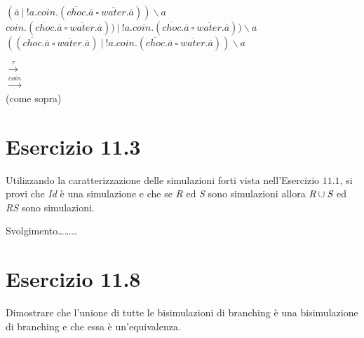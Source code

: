 		\begin{minipage}{0.5\linewidth}
			\begin{flushleft}
				\vspace{5mm}
				$(\overline{a}\ |\ !a.coin.(\overline{choc}.\overline{a}\ \square\ \overline{water}.\overline{a}))\backslash a$\\
				\vspace{5mm}
				$coin.(\overline{choc}.\overline{a}\ \square\ \overline{water}.\overline{a}))\ |\ !a.coin.(\overline{choc}.\overline{a}\ \square\ \overline{water}.\overline{a}))\backslash a$\\
				\vspace{5mm}
				$((\overline{choc}.\overline{a}\ \square\ \overline{water}.\overline{a})\ |\ !a.coin.(\overline{choc}.\overline{a}\ \square\ \overline{water}.\overline{a}))\backslash a$
			\end{flushleft}
		\end{minipage}
		\hfill
		\begin{minipage}{0.4\linewidth}
			\begin{flushright}
				\vspace{5mm}
				$\xrightarrow{\tau}$\\
				\vspace{5mm}
				$\xrightarrow{coin}$\\
				\vspace{5mm}
				(come sopra)
			\end{flushright}
		\end{minipage}
		
		\newpage
		
	\section{Esercizio 11.3}
		\qquad Utilizzando la caratterizzazione delle simulazioni forti vista
		nell'Esercizio $11.1$, si provi che \emph{Id} \`e una simulazione e che se
		\emph{R} ed \emph{S} sono simulazioni allora $\emph{R} \cup \emph{S}$ ed
		\emph{RS} sono simulazioni.
		
		\sectionline
		
		\qquad Svolgimento\ldots\ldots\ldots
		
		\newpage
		
	\section{Esercizio 11.8}
		\qquad Dimostrare che l'unione di tutte le bisimulazioni di branching \`e una
		bisimulazione di branching e che essa \`e un'equivalenza.
		
